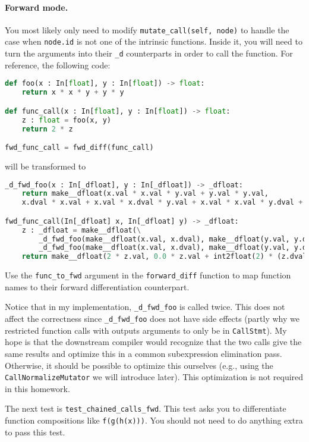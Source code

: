 \paragraph{Forward mode.} You most likely only need to modify \lstinline{mutate_call(self, node)} to handle the case when \lstinline{node.id} is not one of the intrinsic functions. Inside it, you will need to turn the arguments into their \lstinline{_d} counterparts in order to call the function. For reference, the following code:
\begin{lstlisting}[language=Python]
def foo(x : In[float], y : In[float]) -> float:
    return x * x * y + y * y

def func_call(x : In[float], y : In[float]) -> float:
    z : float = foo(x, y)
    return 2 * z

fwd_func_call = fwd_diff(func_call)
\end{lstlisting}
will be transformed to
\begin{lstlisting}[language=Python]
_d_fwd_foo(x : In[_dfloat], y : In[_dfloat]) -> _dfloat:
    return make__dfloat(x.val * x.val * y.val + y.val * y.val,
    x.dval * x.val + x.val * x.dval * y.val + x.val * x.val * y.dval + y.dval * y.val + y.val * y.dval)

fwd_func_call(In[_dfloat] x, In[_dfloat] y) -> _dfloat:
    z : _dfloat = make__dfloat(\
        _d_fwd_foo(make__dfloat(x.val, x.dval), make__dfloat(y.val, y.dval)).val,
        _d_fwd_foo(make__dfloat(x.val, x.dval), make__dfloat(y.val, y.dval)).dval)
    return make__dfloat(2 * z.val, 0.0 * z.val + int2float(2) * (z.dval))
\end{lstlisting}
Use the \lstinline{func_to_fwd} argument in the \lstinline{forward_diff} function to map function names to their forward differentiation counterpart.

Notice that in my implementation, \lstinline{_d_fwd_foo} is called twice. This does not affect the correctness since \lstinline{_d_fwd_foo} does not have side effects (partly why we restricted function calls with outputs arguments to only be in \lstinline{CallStmt}). My hope is that the downstream compiler would recognize that the two calls give the same results and optimize this in a common subexpression elimination pass. Otherwise, it should be possible to optimize this ourselves (e.g., using the \lstinline{CallNormalizeMutator} we will introduce later). This optimization is not required in this homework.

The next test is \lstinline{test_chained_calls_fwd}. This test asks you to differentiate function compositions like \lstinline{f(g(h(x)))}. You should not need to do anything extra to pass this test.

